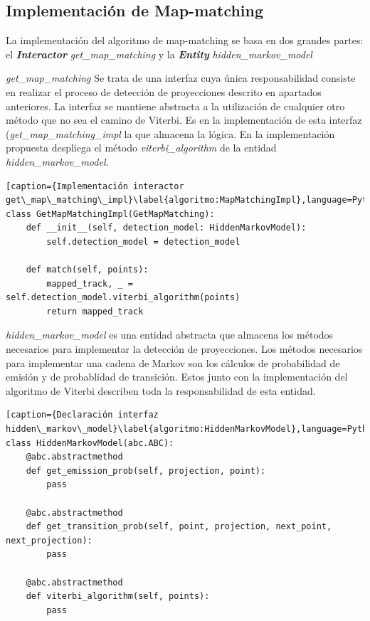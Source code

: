 \subsection{Implementación de Map-matching}
La implementación del algoritmo de map-matching se basa en dos grandes partes: 
el \textbf{\textit{Interactor}} \textit{get\_map\_matching} y la \textbf{\textit{Entity}} 
\textit{hidden\_markov\_model}

\textit{get\_map\_matching} Se trata de una interfaz cuya única responsabilidad consiste en realizar 
el proceso de detección de proyecciones descrito en apartados anteriores. La interfaz se mantiene 
abstracta a la utilización de cualquier otro método que no sea el camino de Viterbi. Es en la implementación 
de esta interfaz (\textit{get\_map\_matching\_impl} la que almacena la lógica. En la implementación propuesta despliega el método \textit{viterbi\_algorithm} de la entidad \textit{hidden\_markov\_model}.

\begin{lstlisting}[caption={Implementación interactor get\_map\_matching\_impl}\label{algoritmo:MapMatchingImpl},language=Python] 
class GetMapMatchingImpl(GetMapMatching):
    def __init__(self, detection_model: HiddenMarkovModel):
        self.detection_model = detection_model

    def match(self, points):
        mapped_track, _ = self.detection_model.viterbi_algorithm(points)
        return mapped_track

\end{lstlisting}

\textit{hidden\_markov\_model} es una entidad abstracta que almacena los métodos necesarios para 
implementar la detección de proyecciones. Los métodos necesarios para implementar una cadena de 
Markov son los cálculos de probabilidad de emisión y de probablidad de transición. Estos junto con la 
implementación del algoritmo de Viterbi describen toda la responsabilidad de esta entidad.

\begin{lstlisting}[caption={Declaración interfaz hidden\_markov\_model}\label{algoritmo:HiddenMarkovModel},language=Python] 
class HiddenMarkovModel(abc.ABC):
    @abc.abstractmethod
    def get_emission_prob(self, projection, point):
        pass

    @abc.abstractmethod
    def get_transition_prob(self, point, projection, next_point, next_projection):
        pass

    @abc.abstractmethod
    def viterbi_algorithm(self, points):
        pass
\end{lstlisting}



